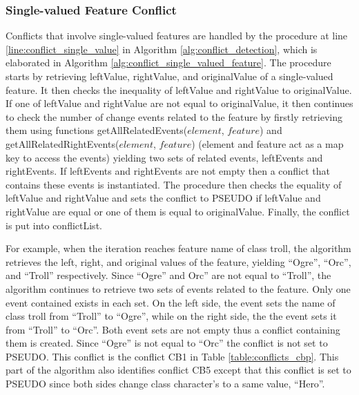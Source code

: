 \subsubsection{Single-valued Feature Conflict} 
\label{sec:single_valued_conflict}
Conflicts that involve single-valued features are handled by the procedure at line \ref{line:conflict_single_value} in Algorithm \ref{alg:conflict_detection}, which is elaborated in Algorithm \ref{alg:conflict_single_valued_feature}. The procedure starts by retrieving \textsf{leftValue}, \textsf{rightValue}, and \textsf{originalValue} of a single-valued feature. It then checks the inequality of \textsf{leftValue} and \textsf{rightValue} to \textsf{originalValue}. If one of \textsf{leftValue} and \textsf{rightValue} are not equal to \textsf{originalValue}, it then continues to check the number of change events related to the feature by firstly retrieving them using functions \textsf{getAllRelatedEvents($element$, $feature$)} and \textsf{getAllRelatedRightEvents($element$, $feature$)} (element and feature act as a map key to access the events) yielding two sets of related events, \textsf{leftEvents} and \textsf{rightEvents}. If \textsf{leftEvents} and \textsf{rightEvents} are not empty then a conflict that contains these events is instantiated. The procedure then checks the equality of \textsf{leftValue} and \textsf{rightValue} and sets the conflict to \textsf{PSEUDO} if \textsf{leftValue} and \textsf{rightValue} are equal or one of them is equal to \textsf{originalValue}. Finally, the conflict is put into \textsf{conflictList}. 

For example, when the iteration reaches feature \textsf{name} of class \textsf{troll}, the algorithm retrieves the left, right, and original values of the feature, yielding ``Ogre'', ``Orc'', and ``Troll'' respectively. Since ``Ogre'' and Orc'' are not equal to ``Troll'', the algorithm continues to retrieve two sets of events related to the feature. Only one event contained exists in each set. On the left side, the event sets the name of class \textsf{troll} from ``Troll'' to ``Ogre'', while on the right side, the the event sets it from ``Troll'' to ``Orc''. Both event sets are not empty thus a conflict containing them is created. Since ``Ogre'' is not equal to ``Orc'' the conflict is not set to \textsf{PSEUDO}. This conflict is the conflict \textsf{CB1} in Table \ref{table:conflicts_cbp}. This part of the algorithm also identifies conflict \textsf{CB5} except that this conflict is set to \textsf{PSEUDO} since both sides change class \textsf{character}'s  to a same value, ``Hero''.   

